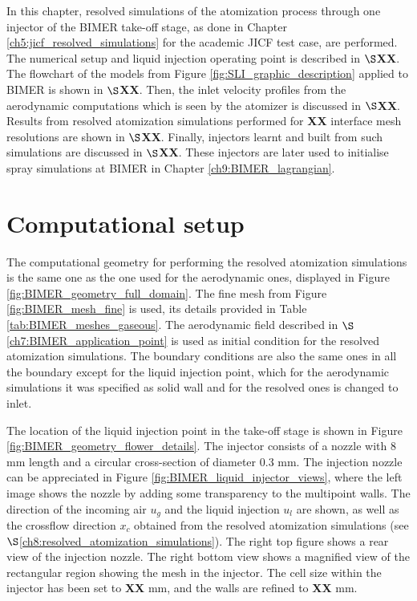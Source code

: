 In this chapter, resolved simulations of the atomization process through one injector of the BIMER take-off stage, as done in Chapter \ref{ch5:jicf_resolved_simulations} for the academic JICF test case, are performed. The numerical setup and liquid injection operating point is described in $\S$\textbf{XX}. The flowchart of the models from Figure \ref{fig:SLI_graphic_description} applied to BIMER is shown in $\S$\textbf{XX}. Then, the inlet velocity profiles from the aerodynamic computations which is seen by the atomizer is discussed in $\S$\textbf{XX}. Results from resolved atomization simulations performed for \textbf{XX} interface mesh resolutions are shown in $\S$\textbf{XX}. Finally, injectors learnt and built from such simulations are discussed in $\S$\textbf{XX}. These injectors are later used to initialise spray simulations at BIMER in Chapter \ref{ch9:BIMER_lagrangian}.



\section{Computational setup}

The computational geometry for performing the resolved atomization simulations is the same one as the one used for the aerodynamic ones, displayed in Figure \ref{fig:BIMER_geometry_full_domain}. The fine mesh from Figure \ref{fig:BIMER_mesh_fine} is used, its details provided in Table \ref{tab:BIMER_meshes_gaseous}. The aerodynamic field described in $\S$\ref{ch7:BIMER_application_point} is used as initial condition for the resolved atomization simulations. The boundary conditions are also the same ones in all the boundary except for the liquid injection point, which for the aerodynamic simulations it was specified as solid wall and for the resolved ones is changed to inlet. 

The location of the liquid injection point in the take-off stage is shown in Figure \ref{fig:BIMER_geometry_flower_details}. The injector consists of a nozzle with 8 mm length and a circular cross-section of diameter 0.3 mm. The injection nozzle can be appreciated in Figure \ref{fig:BIMER_liquid_injector_views}, where the left image shows the nozzle by adding some transparency to the multipoint walls. The direction of the incoming air $u_g$ and the liquid injection $u_l$ are shown, as well as the crossflow direction $x_c$ obtained from the resolved atomization simulations (see $\S$\ref{ch8:resolved_atomization_simulations}). The right top figure shows a rear view of the injection nozzle. The right bottom view shows a magnified view of the rectangular region showing the mesh in the injector. The cell size within the injector has been set to \textbf{XX} mm, and the walls are refined to \textbf{XX} mm.

